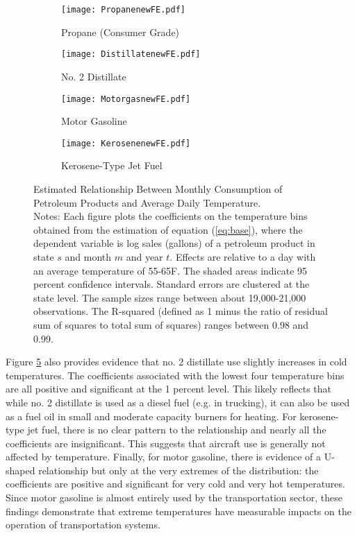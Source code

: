 \documentclass[11pt]{article}
\begin{document}
\begin{figure}
	\centering
	
	\begin{subfigure}{0.49\textwidth}
		\centering
		\caption{Propane (Consumer Grade)}
		\label{fig:propane}
		\texttt{[image: PropanenewFE.pdf]}
	\end{subfigure} \hspace{0em}%
	\begin{subfigure}{0.49\textwidth}
		\centering
		\caption{No. 2 Distillate}
		\label{fig:distillate}
		\texttt{[image: DistillatenewFE.pdf]}
	\end{subfigure}
	\begin{subfigure}{0.49\textwidth}
		\centering
		\caption{Motor Gasoline}
		\label{fig:motorgas}
		\texttt{[image: MotorgasnewFE.pdf]}
	\end{subfigure}
	\begin{subfigure}{0.49\textwidth}
		\centering
		\caption{Kerosene-Type Jet Fuel}
		\label{fig:kerosene}
		\texttt{[image: KerosenenewFE.pdf]}
	\end{subfigure}
	\caption{Estimated Relationship Between Monthly Consumption of Petroleum Products and Average Daily Temperature. \\ {\small Notes: Each figure plots the coefficients on the temperature bins obtained from the estimation of equation (\ref{eq:base}), where the dependent variable is log sales (gallons) of a petroleum product in state $s$ and month $m$ and year $t$. Effects are relative to a day with an average temperature of 55-65\degree F. The shaded areas indicate 95 percent confidence intervals. Standard errors are clustered at the state level. The sample sizes range between about 19,000-21,000 observations. The R-squared (defined as 1 minus the ratio of residual sum of squares to total sum of squares) ranges between 0.98 and 0.99.}} 
	\label{fig:petroleumproducts}
\end{figure}

Figure \ref{fig:petroleumproducts} also provides evidence that no. 2 distillate use slightly increases in cold temperatures. The coefficients associated with the lowest four temperature bins are all positive and significant at the 1 percent level. This likely reflects that while no. 2 distillate is used as a diesel fuel (e.g. in trucking), it can also be used as a fuel oil in small and moderate capacity burners for heating. For kerosene-type jet fuel, there is no clear pattern to the relationship and nearly all the coefficients are insignificant. This suggests that aircraft use is generally not affected by temperature. Finally, for motor gasoline, there is evidence of a U-shaped relationship but only at the very extremes of the distribution: the coefficients are positive and significant for very cold and very hot temperatures. Since motor gasoline is almost entirely used by the transportation sector, these findings demonstrate that extreme temperatures have measurable impacts on the operation of transportation systems.
\end{document}
